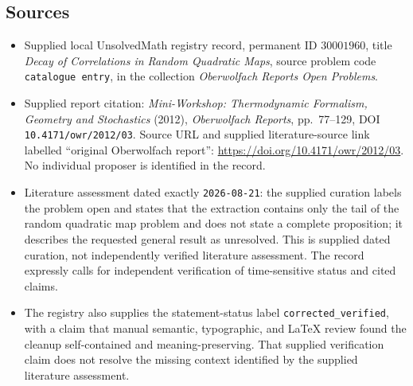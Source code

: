 \documentclass[11pt]{article}
\begin{document}
\subsection{Sources}
\begin{itemize}
\item Supplied local UnsolvedMath registry record, permanent ID \(30001960\), title \emph{Decay of Correlations in Random Quadratic Maps}, source problem code \texttt{catalogue entry}, in the collection \emph{Oberwolfach Reports Open Problems}.
\item Supplied report citation: \emph{Mini-Workshop: Thermodynamic Formalism, Geometry and Stochastics} (2012), \emph{Oberwolfach Reports}, pp.\ 77--129, DOI \texttt{10.4171/owr/2012/03}. Source URL and supplied literature-source link labelled ``original Oberwolfach report'': \url{https://doi.org/10.4171/owr/2012/03}. No individual proposer is identified in the record.
\item Literature assessment dated exactly \texttt{2026-08-21}: the supplied curation labels the problem open and states that the extraction contains only the tail of the random quadratic map problem and does not state a complete proposition; it describes the requested general result as unresolved. This is supplied dated curation, not independently verified literature assessment. The record expressly calls for independent verification of time-sensitive status and cited claims.
\item The registry also supplies the statement-status label \texttt{corrected\_verified}, with a claim that manual semantic, typographic, and LaTeX review found the cleanup self-contained and meaning-preserving. That supplied verification claim does not resolve the missing context identified by the supplied literature assessment.
\end{itemize}
\end{document}

